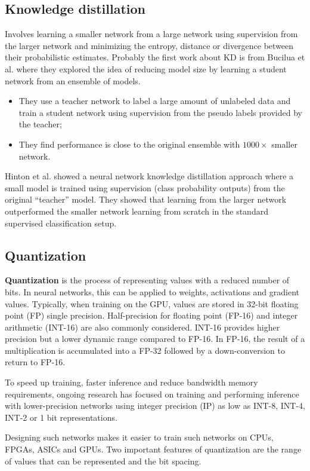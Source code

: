 \subsection{Knowledge distillation}
Involves learning a smaller network from a large network using supervision from
the larger network and minimizing the entropy, distance or divergence between
their probabilistic estimates. Probably the first work about KD is from Bucilua
et al. where they explored the idea of reducing model size by learning a student
network from an ensemble of models.
\begin{itemize}
    \item They use a teacher network to label a large amount of unlabeled data
          and train a student network using supervision from the pseudo labels
          provided by the teacher;
    \item They find performance is close to the original ensemble with $1000 \times$
          smaller network.
\end{itemize}

Hinton et al. showed a neural network knowledge distillation approach where a
small model is trained using supervision (class probability outputs) from the
original “teacher” model. They showed that learning from the larger network
outperformed the smaller network learning from scratch in the standard supervised
classification setup.
\subsection{Quantization}
\textbf{Quantization} is the process of representing values with a reduced number
of bits. In neural networks, this can be applied to weights, activations and
gradient values. Typically, when training on the GPU, values are stored in 32-bit
floating point (FP) single precision. Half-precision for floating point (FP-16)
and integer arithmetic (INT-16) are also commonly considered. INT-16 provides
higher precision but a lower dynamic range compared to FP-16. In FP-16, the result
of a multiplication is accumulated into a FP-32 followed by a down-conversion to
return to FP-16.

To speed up training, faster inference and reduce bandwidth memory requirements,
ongoing research has focused on training and performing inference with lower-precision
networks using integer precision (IP) as low as INT-8, INT-4, INT-2 or 1 bit
representations.

Designing such networks makes it easier to train such networks on CPUs, FPGAs,
ASICs and GPUs. Two important features of quantization are the range of values
that can be represented and the bit spacing.

